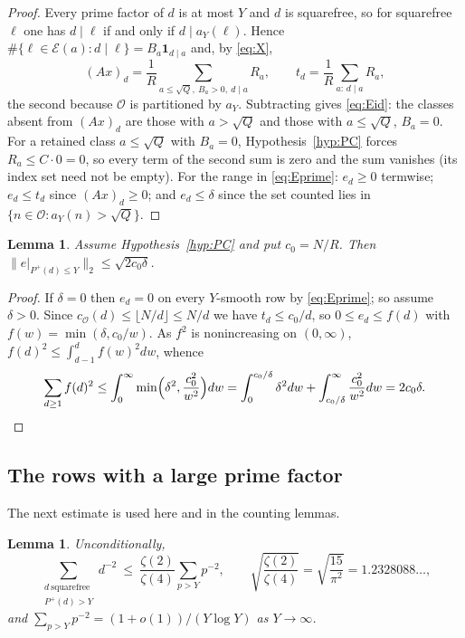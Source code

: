 \documentclass[11pt,a4paper]{article}
\theoremstyle{plain}
\newtheorem{lemma}[theorem]{Lemma}
\theoremstyle{definition}
\theoremstyle{remark}
\newcommand{\Pp}{P^{+}}
\newcommand{\vB}{\mathcal{E}}
\newcommand{\vR}{\mathcal{O}}
\begin{document}
\begin{proof}
Every prime factor of $d$ is at most $Y$ and $d$ is squarefree, so for squarefree $\ell$ one has
$d\mid\ell$ if and only if $d\mid a_{Y}(\ell)$. Hence
$\#\{\ell\in\vB(a):d\mid\ell\}=B_{a}\mathbf1_{d\mid a}$ and, by \eqref{eq:X},
\[
  (Ax)_{d}=\frac1R\!\!\sum_{a\le\sqrt Q,\ B_{a}>0,\ d\mid a}\!\!R_{a},\qquad
  t_{d}=\frac1R\sum_{a:\,d\mid a}R_{a},
\]
the second because $\vR$ is partitioned by $a_{Y}$. Subtracting gives \eqref{eq:Eid}: the classes absent
from $(Ax)_{d}$ are those with $a>\sqrt Q$ and those with $a\le\sqrt Q$, $B_{a}=0$. For a retained class
$a\le\sqrt Q$ with $B_{a}=0$, Hypothesis~\ref{hyp:PC} forces $R_{a}\le C\cdot0=0$, so every term of the
second sum is zero and the sum vanishes (its index set need not be empty). For the range in
\eqref{eq:Eprime}:
$e_{d}\ge0$ termwise; $e_{d}\le t_{d}$ since $(Ax)_{d}\ge0$; and $e_{d}\le\delta$ since the set counted
lies in $\{n\in\vR:a_{Y}(n)>\sqrt Q\}$.
\end{proof}

\begin{lemma}\label{lem:disc}
Assume Hypothesis~\ref{hyp:PC} and put $c_{0}=N/R$. Then
$\bigl\|e|_{\Pp(d)\le Y}\bigr\|_{2}\le\sqrt{2c_{0}\delta}$.
\end{lemma}

\begin{proof}
If $\delta=0$ then $e_{d}=0$ on every $Y$-smooth row by \eqref{eq:Eprime}; so assume $\delta>0$. Since
$c_{\vR}(d)\le\lfloor N/d\rfloor\le N/d$ we have $t_{d}\le c_{0}/d$, so $0\le e_{d}\le f(d)$ with
$f(w)=\min(\delta,c_{0}/w)$. As $f^{2}$ is nonincreasing on $(0,\infty)$,
$f(d)^{2}\le\int_{d-1}^{d}f(w)^{2}dw$, whence
\[
  \sum_{d\ge1}f(d)^{2}\le\int_{0}^{\infty}\min\Bigl(\delta^{2},\frac{c_{0}^{2}}{w^{2}}\Bigr)dw
  =\int_{0}^{c_{0}/\delta}\delta^{2}dw+\int_{c_{0}/\delta}^{\infty}\frac{c_{0}^{2}}{w^{2}}dw
  =2c_{0}\delta.\qedhere
\]
\end{proof}

\subsection{The rows with a large prime factor}\label{sec:roughrows}

The next estimate is used here and in the counting lemmas.

\begin{lemma}\label{lem:primetail}
Unconditionally,
\[
  \sum_{\substack{d\ \text{squarefree}\\ \Pp(d)>Y}}d^{-2}
  \ \le\ \frac{\zeta(2)}{\zeta(4)}\sum_{p>Y}p^{-2},\qquad
  \sqrt{\frac{\zeta(2)}{\zeta(4)}}=\sqrt{\frac{15}{\pi^{2}}}=1.2328088\ldots,
\]
and $\sum_{p>Y}p^{-2}=(1+o(1))/(Y\log Y)$ as $Y\to\infty$.
\end{lemma}
\end{document}
